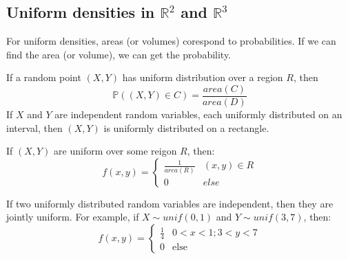 \documentclass[titlepage, 12pt, leqno]{article}
\begin{document}
\subsection{Uniform densities in $\mathbb{R}^2$ and $\mathbb{R}^3$}
For uniform densities, areas (or volumes) corespond to probabilities. If we can 
find the area (or volume), we can get the probability.
\vspace{10px}

If a random point $(X,Y)$ has uniform distribution over a region $R$, then
\[
    \mathbb{P}((X,Y) \in C) = \frac{area(C)}{area(D)}
\]
If $X$ and $Y$ are independent random variables, each uniformly distributed on an
interval, then $(X,Y)$ is uniformly distributed on a rectangle.
\vspace{10px}

If $(X,Y)$ are uniform over some reigon $R$, then:
\[
    f(x,y) = 
    \begin{cases}
        \frac{1}{area(R)} & (x,y) \in R\\
        0 & else
    \end{cases}
\]
\begin{note}
    If two uniformly distributed random variables are independent, then they are
    jointly uniform. For example, if $X \sim unif(0,1)$ and $Y \sim unif(3,7)$, 
    then:
    \[
        f(x,y) = 
        \begin{cases}
            \frac{1}{4} & 0<x<1; 3<y<7\\
            0 & \text{else}
        \end{cases}
    \]
\end{note}
\end{document}
